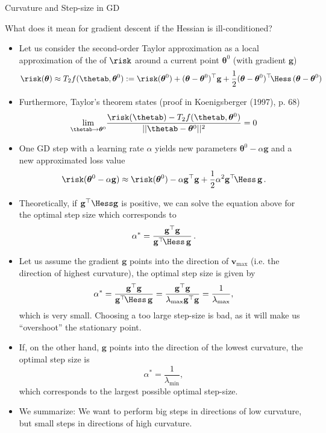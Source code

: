 \begin{vbframe}{Curvature and Step-size in GD}

What does it mean for gradient descent if the Hessian is ill-conditioned?

 \begin{itemize}
 \item Let us consider the second-order Taylor approximation as a local approximation of the of $\risk$ around a current point $\boldsymbol{\theta}^0$ (with gradient $\mathbf{g}$)
    \begin{equation*}
    \risk(\boldsymbol{\theta}) \approx T_2f(\thetab, \boldsymbol{\theta}^0) := \risk(\boldsymbol{\theta}^0) + (\boldsymbol{\theta}-\boldsymbol{\theta}^0)^\top \mathbf{g} + \frac{1}{2}(\boldsymbol{\theta}-\boldsymbol{\theta}^0)^\top \!\Hess\, (\boldsymbol{\theta}-\boldsymbol{\theta}^0)
    \end{equation*}
  \item Furthermore, Taylor's theorem states (proof in Koenigsberger (1997), p. 68)
    \begin{equation*}
     \underset{\thetab \rightarrow \boldsymbol{\theta}^0}{\lim} \frac{\risk(\thetab) - T_2f(\thetab, \boldsymbol{\theta}^0)}{||\thetab-\boldsymbol{\theta}^0||^2} = 0
   \end{equation*}

  \framebreak 

  \item One GD step with a learning rate $\alpha$ yields new parameters $\boldsymbol{\theta}^0-\alpha \mathbf{g}$ and a new approximated loss value
   $$
   \risk(\boldsymbol{\theta}^0-\alpha \mathbf{g}) \approx \risk(\boldsymbol{\theta}^0) - \alpha \mathbf{g}^\top\mathbf{g} + \frac{1}{2}	\alpha^2 \mathbf{g}^\top\!\Hess\,\mathbf{g}  \,.
   $$ 
 
 \item Theoretically, if $\mathbf{g}^\top \Hess \mathbf{g}$ is positive, we can solve the equation above for the optimal step size which corresponds to 
 $$
 \alpha^* = \frac{\mathbf{g}^\top \mathbf{g}}{\mathbf{g}^\top \!\Hess\, \mathbf{g}}  \,.
 $$
 
 \framebreak 

 \item Let us assume the gradient $\mathbf{g}$ points into the direction of $\bm{v}_{\text{max}}$ (i.e. the direction of highest curvature), the optimal step size is given by 
  $$
  \alpha^* = \frac{\mathbf{g}^\top \mathbf{g}}{\mathbf{g}^\top \!\Hess\, \mathbf{g}} = \frac{\mathbf{g}^\top \mathbf{g}}{\lambda_{\text{max}} \mathbf{g}^\top   \mathbf{g}} = \frac{1}{\lambda_{\text{max}}}, 
  $$ 
  which is very small. Choosing a too large step-size is bad, as it will make us \enquote{overshoot} the stationary point.
  \item If, on the other hand, $\mathbf{g}$ points into the direction of the lowest curvature, the optimal step size is 
  $$
  \alpha^* = \frac{1}{\lambda_{\text{min}}}, 
  $$
  which corresponds to the largest possible optimal step-size.
  \item We summarize: We want to perform big steps in directions of low curvature, but small steps in directions of high curvature.


\end{itemize}
\end{vbframe}
